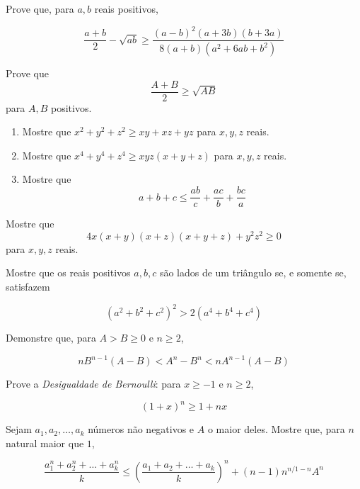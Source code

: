\begin{questao}
  Prove que, para $a,b$ reais positivos,

  $$ \frac{a+b}{2} -\sqrt{ab} \geq
  \frac{(a-b)^2(a+3b)(b+3a)}{8(a+b)(a^2+6ab+b^2)} $$
\end{questao}

\begin{questao}
  Prove que $$ \frac{A+B}{2} \geq \sqrt{AB} $$ para $A,B$ positivos.
\end{questao}

\begin{questao}

  \begin{enumerate}

  \item Mostre que $x^2+y^2+z^2 \geq xy+xz+yz$ para $x,y,z$ reais.

  \item Mostre que $x^4+y^4+z^4 \geq xyz(x+y+z)$ para $x,y,z$ reais.

  \item Mostre que
    $$a+b+c \leq \frac{ab}{c}+ \frac{ac}{b}+ \frac{bc}{a}$$
  \end{enumerate}

\end{questao}

\begin{questao}
  Mostre que
  $$ 4x(x+y)(x+z)(x+y+z) + y^2z^2 \geq 0 $$ para $x,y,z$ reais.
\end{questao}

\begin{questao}
  Mostre que os reais positivos $a,b,c$ são lados de um triângulo se, e somente
  se, satisfazem

  $$ (a^2+b^2+c^2)^2 > 2(a^4+b^4+c^4) $$
\end{questao}

\begin{questao}
  Demonstre que, para $A>B \geq 0$ e $n \geq 2$,

  $$ nB^{n-1}(A-B) < A^n-B^n < nA^{n-1}(A-B) $$
\end{questao}

\begin{questao}
  Prove a {\it Desigualdade de Bernoulli}: para $x \geq -1$ e $n \geq 2$,

  $$ (1+x)^n \geq 1+nx $$
\end{questao}

\begin{questao}
  Sejam $a_1,a_2,\ldots,a_k$ números não negativos e $A$ o maior deles. Mostre
  que, para $n$ natural maior que $1$,

  $$ \frac{a_1^n+a_2^n+ \ldots +a_k^n}{k} \leq (\frac{a_1+a_2+ \ldots
    +a_k}{k})^n + (n-1)n^{n/{1-n}}A^n $$
\end{questao}

